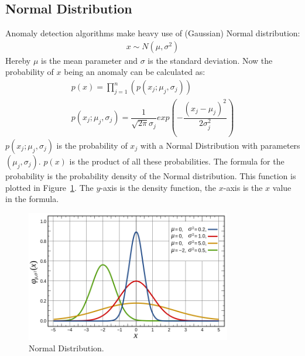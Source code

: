 \subsection{Normal Distribution}
\noindent Anomaly detection algorithms make heavy use of (Gaussian) Normal distribution:
\begin{align}
x \sim N(\mu, \sigma^2)
\end{align}
Hereby $\mu$ is the mean parameter and $\sigma$ is the standard deviation. Now the probability of $x$ being an anomaly can be calculated as:
\begin{align}
p(x) = \prod_{j=1}^n( p(x_j ; \mu_j, \sigma_j)  ) \\
p(x_j ; \mu_j, \sigma_j) = \dfrac{1}{\sqrt{2\pi}\sigma_j} exp(- \dfrac{(x_j - \mu_j)^2}{2\sigma_j^2}) 
\end{align}
\noindent $p(x_j ; \mu_j, \sigma_j)$ is the probability of $x_j$ with a Normal Distribution with parameters $(\mu_j, \sigma_j)$. $p(x)$ is the product of all these probabilities. The formula for the probability is the probability density of the Normal distribution. This function is plotted in Figure~\ref{fig:normalExample}. The $y$-axis is the density function, the $x$-axis is the $x$ value in the formula. 

\begin{figure}[H]
\centering
\includegraphics[width=0.8\textwidth]{Figures/normaldist}
\decoRule
\caption[Normal Distribution]{Normal Distribution. \cite{normalExample}}
\label{fig:normalExample}
\end{figure}

